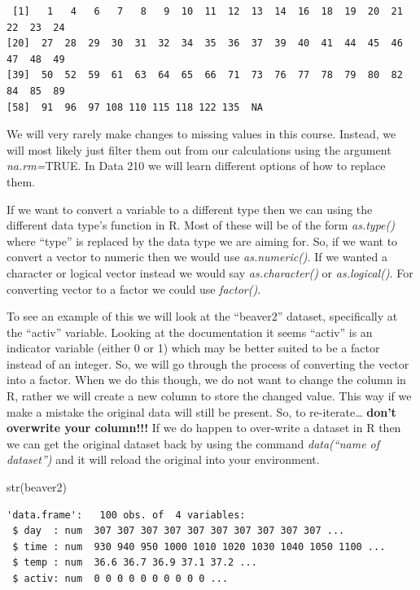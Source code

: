 \documentclass[
  letterpaper,
  DIV=11,
  numbers=noendperiod]{scrreprt}
\newenvironment{Shaded}{\begin{snugshade}}{\end{snugshade}}
\newcommand{\FunctionTok}[1]{\textcolor[rgb]{0.28,0.35,0.67}{#1}}
\newcommand{\NormalTok}[1]{\textcolor[rgb]{0.00,0.23,0.31}{#1}}
\begin{document}
\begin{verbatim}
 [1]   1   4   6   7   8   9  10  11  12  13  14  16  18  19  20  21  22  23  24
[20]  27  28  29  30  31  32  34  35  36  37  39  40  41  44  45  46  47  48  49
[39]  50  52  59  61  63  64  65  66  71  73  76  77  78  79  80  82  84  85  89
[58]  91  96  97 108 110 115 118 122 135  NA
\end{verbatim}

We will very rarely make changes to missing values in this course.
Instead, we will most likely just filter them out from our calculations
using the argument \emph{na.rm=}TRUE. In Data 210 we will learn
different options of how to replace them.

If we want to convert a variable to a different type then we can using
the different data type's function in R. Most of these will be of the
form \emph{as.type()} where ``type'' is replaced by the data type we are
aiming for. So, if we want to convert a vector to numeric then we would
use \emph{as.numeric()}. If we wanted a character or logical vector
instead we would say \emph{as.character()} or \emph{as.logical()}. For
converting vector to a factor we could use \emph{factor()}.

To see an example of this we will look at the ``beaver2'' dataset,
specifically at the ``activ'' variable. Looking at the documentation it
seems ``activ'' is an indicator variable (either 0 or 1) which may be
better suited to be a factor instead of an integer. So, we will go
through the process of converting the vector into a factor. When we do
this though, we do not want to change the column in R, rather we will
create a new column to store the changed value. This way if we make a
mistake the original data will still be present. So, to
re-iterate\ldots{} \textbf{don't overwrite your column!!!} If we do
happen to over-write a dataset in R then we can get the original dataset
back by using the command \emph{data(``name of dataset'')} and it will
reload the original into your environment.

\begin{Shaded}
\begin{Highlighting}[]
\FunctionTok{str}\NormalTok{(beaver2)}
\end{Highlighting}
\end{Shaded}

\begin{verbatim}
'data.frame':   100 obs. of  4 variables:
 $ day  : num  307 307 307 307 307 307 307 307 307 307 ...
 $ time : num  930 940 950 1000 1010 1020 1030 1040 1050 1100 ...
 $ temp : num  36.6 36.7 36.9 37.1 37.2 ...
 $ activ: num  0 0 0 0 0 0 0 0 0 0 ...
\end{verbatim}
\end{document}
